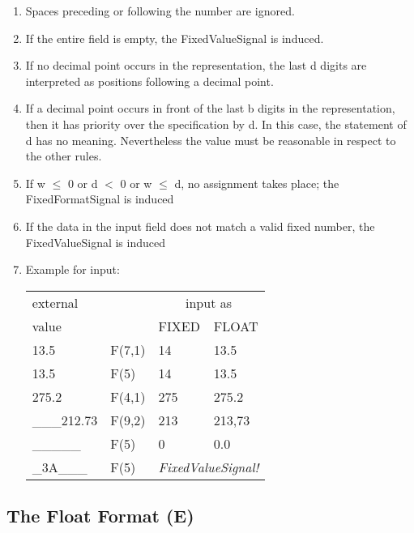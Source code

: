 \begin{enumerate}
\begin{enumerate}
\item Spaces preceding or following the number are ignored.
\item If the entire field is empty, the FixedValueSignal is induced.
\item If no decimal point occurs in the representation, the last d
digits are interpreted as positions following a decimal point.
\item If a decimal point occurs in front of the last b digits in the
representation, then it has priority over the specification by d. In
this case, the statement of d has no meaning. Nevertheless the value must
be reasonable in respect to the other rules. 
\item If w $\leq$ 0 or d $<$ 0 or w $\leq$ d, no assignment takes place;
    the FixedFormatSignal is induced
\item If the data in the input field does not match a valid fixed 
   number, the FixedValueSignal is induced


\item Example for input:

\begin{tabular}{llll}
external       &          & \multicolumn{2}{c}{input as}  \\ 
value       &          & FIXED & FLOAT  \\ \hline
13.5   & F(7,1)   &  14 & 13.5   \\
13.5   & F(5)     &  14 & 13.5   \\
275.2  & F(4,1)   & 275 & 275.2 \\
\_\_\_212.73 &  F(9,2)&  213 & 213,73 \\
\_\_\_\_\_ & F(5) & 0& 0.0 \\
\_3A\_\_\_ & F(5) & \multicolumn{2}{c}{\em FixedValueSignal!} \\
\end{tabular}
\end{enumerate}
\end{enumerate}


\subsection{The Float Format (E)}   %
\label{sec_dation_e_format}

